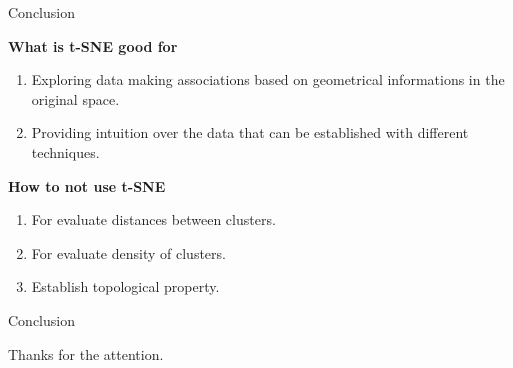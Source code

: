 \documentclass[10pt]{beamer}
\theoremstyle{definition}
\newcommand{\1}{\mathbbm{1}}
\begin{document}
\begin{frame}{Conclusion}
  \begin{minipage}{0.45\textwidth}
    \begin{center}
      {\bf What is t-SNE good for}
    \end{center}
    \begin{enumerate}
      \item Exploring data making associations based on geometrical
        informations in the original space.
      \item Providing intuition over the data that can be established  with different
        techniques.
    \end{enumerate}
  \end{minipage}
  \hfill
  \begin{minipage}[h!]{0.45\textwidth}
    \begin{center}
      {\bf How to not use t-SNE}
    \end{center}
    \begin{enumerate}
      \item For evaluate distances between clusters.
      \item For evaluate density of clusters.
      \item Establish topological property.
    \end{enumerate}
  \end{minipage}
\end{frame}
\begin{frame}{Conclusion}{}
    \begin{center}
       \Large
      Thanks for the attention.
    \end{center}
  \end{frame}
\end{document}
